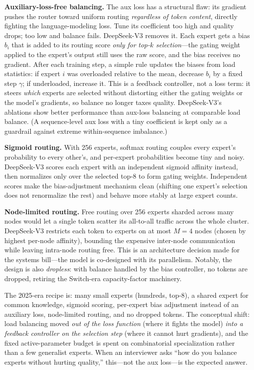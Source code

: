 \textbf{Auxiliary-loss-free balancing.} The aux loss has a structural flaw: its gradient pushes the router toward uniform routing \textit{regardless of token content}, directly fighting the language-modeling loss. Tune its coefficient too high and quality drops; too low and balance fails. DeepSeek-V3 removes it. Each expert gets a bias $b_i$ that is added to its routing score \textit{only for top-$k$ selection}---the gating weight applied to the expert's output still uses the raw score, and the bias receives no gradient. After each training step, a simple rule updates the biases from load statistics: if expert $i$ was overloaded relative to the mean, decrease $b_i$ by a fixed step $\gamma$; if underloaded, increase it. This is a feedback controller, not a loss term: it steers \textit{which} experts are selected without distorting either the gating weights or the model's gradients, so balance no longer taxes quality. DeepSeek-V3's ablations show better performance than aux-loss balancing at comparable load balance. (A sequence-level aux loss with a tiny coefficient is kept only as a guardrail against extreme within-sequence imbalance.)

\textbf{Sigmoid routing.} With 256 experts, softmax routing couples every expert's probability to every other's, and per-expert probabilities become tiny and noisy. DeepSeek-V3 scores each expert with an independent sigmoid affinity instead, then normalizes only over the selected top-8 to form gating weights. Independent scores make the bias-adjustment mechanism clean (shifting one expert's selection does not renormalize the rest) and behave more stably at large expert counts.

\textbf{Node-limited routing.} Free routing over 256 experts sharded across many nodes would let a single token scatter its all-to-all traffic across the whole cluster. DeepSeek-V3 restricts each token to experts on at most $M = 4$ nodes (chosen by highest per-node affinity), bounding the expensive inter-node communication while leaving intra-node routing free. This is an architecture decision made for the systems bill---the model is co-designed with its parallelism. Notably, the design is also \textit{dropless}: with balance handled by the bias controller, no tokens are dropped, retiring the Switch-era capacity-factor machinery.

\begin{keyinsight}
The 2025-era recipe is: many small experts (hundreds, top-8), a shared expert for common knowledge, sigmoid scoring, per-expert bias adjustment instead of an auxiliary loss, node-limited routing, and no dropped tokens. The conceptual shift: load balancing moved \textit{out of the loss function} (where it fights the model) \textit{into a feedback controller on the selection step} (where it cannot hurt gradients), and the fixed active-parameter budget is spent on combinatorial specialization rather than a few generalist experts. When an interviewer asks ``how do you balance experts without hurting quality,'' this---not the aux loss---is the expected answer.
\end{keyinsight}

